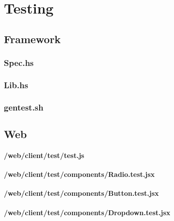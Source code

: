 \chapter{Testing}
\label{app:testing}

\section{Framework}\label{app:testing_framework}

\subsection{Spec.hs}\label{app:testing_spec_hs}


\subsection{Lib.hs}\label{app:testing_lib_hs}


\subsection{gentest.sh}\label{app:testing_gentest_sh}




\section{Web}
\label{app:testing_web}

\subsubsection{/web/client/test/test.js}
\label{app:web_test_js}


\subsubsection{/web/client/test/components/Radio.test.jsx}
\label{app:web_Radio_test_jsx}


\subsubsection{/web/client/test/components/Button.test.jsx}
\label{app:web_Button_test_jsx}


\subsubsection{/web/client/test/components/Dropdown.test.jsx}
\label{app:web_Dropdown_test_jsx}

